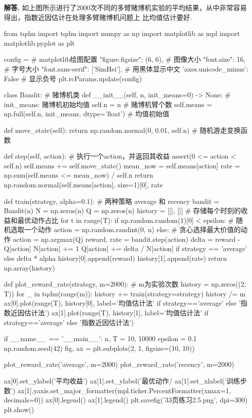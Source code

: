 \documentclass[12pt, a4paper, oneside]{ctexart}
\newenvironment{solution}[1][]{\par\noindent\textbf{#1解答. }}{\smallskip\par}  %
\begin{document}
\begin{solution}
    如上图所示进行了2000次不同的多臂赌博机实验的平均结果，从中非常容易得出，指数近因估计在处理多臂赌博机问题上
    比均值估计要好.
    \begin{pythoncode}
from tqdm import tqdm
import numpy as np
import matplotlib as mpl
import matplotlib.pyplot as plt

config = {  # matplotlib绘图配置
    "figure.figsize": (6, 6),  # 图像大小
    "font.size": 16, # 字号大小
    "font.sans-serif": ['SimHei'],   # 用黑体显示中文
    'axes.unicode_minus': False # 显示负号
}
plt.rcParams.update(config)

class Bandit:  # 赌博机类
    def __init__(self, n, init_means=0) -> None:
        # init_means: 赌博机初始均值
        self.n = n  # 赌博机臂个数
        self.means = np.full(self.n, init_means, dtype='float')  # 均值初始值

    def move_state(self):
        return np.random.normal(0, 0.01, self.n)  # 随机游走变换函数

    def step(self, action):  # 执行一个action，并返回其收益
        assert(0 <= action < self.n)
        self.means += self.move_state()
        mean_now = self.means[action]
        rate = np.sum(self.means <= mean_now) / self.n
        return np.random.normal(self.means[action], size=1)[0], rate

def train(strategy, alpha=0.1):
    # 两种策略 average 和 recency
    bandit = Bandit(n)
    N = np.zeros(n)
    Q = np.zeros(n)
    history = [[], []]   # 存储每个时刻的收益和最优动作占比
    for t in range(T):
        if np.random.random(1)[0] < epsilon:  # 随机选取一个动作
            action = np.random.randint(0, n)
        else:  # 贪心选择最大价值的动作
            action = np.argmax(Q)
        reward, rate = bandit.step(action)
        delta = reward - Q[action]
        N[action] += 1
        Q[action] +=  delta / N[action] if strategy == 'average' else delta * alpha
        history[0].append(reward)
        history[1].append(rate)
    return np.array(history)

def plot_reward_rate(strategy, m=2000):  # m为实验次数
    history = np.zeros((2, T))
    for _ in tqdm(range(m)):
        history += train(strategy=strategy)
    history /= m
    ax[0].plot(range(T), history[0], label='均值估计法' if strategy=='average' else '指数近因估计法')
    ax[1].plot(range(T), history[1], label='均值估计法' if strategy=='average' else '指数近因估计法')
    

if __name__ == '__main__':
    n, T = 10, 10000
    epsilon = 0.1
    np.random.seed(42)
    fig, ax = plt.subplots(2, 1, figsize=(10, 10))

    plot_reward_rate('average', m=2000)
    plot_reward_rate('recency', m=2000)

    ax[0].set_ylabel('平均收益')
    ax[1].set_ylabel('最优动作/%
    ax[1].set_xlabel('训练步数')
    ax[1].yaxis.set_major_formatter(mpl.ticker.PercentFormatter(xmax=1, decimals=0))
    ax[0].legend()
    ax[1].legend()
    plt.savefig('33页练习2.5.png', dpi=300)
    plt.show()
    \end{pythoncode}
\end{solution}
\end{document}
